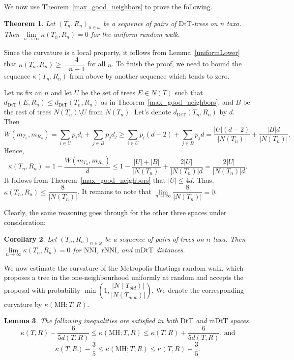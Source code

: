 \documentclass{amsart}
\newtheorem{lemma}{Lemma}
\newtheorem{corollary}[lemma]{Corollary}
\newtheorem{theorem}[lemma]{Theorem}
\newcommand{\dts}{\mathrm{DtT}}
\newcommand{\nni}{\mathrm{NNI}}
\newcommand{\rnni}{\mathrm{rNNI}}
\newcommand{\mdts}{\mathrm{mDtT}}
\newcommand{\MH}{\mathrm{MH}}
\begin{document}
We now use Theorem~\ref{max_good_neighbors} to prove the following.


\begin{theorem}\label{zero-in-the-limit}
Let $(T_n,R_n)_{n\in\omega}$ be a sequence of pairs of $\dts$-trees on $n$ taxa.
Then $\lim\limits_{n \to \infty}\kappa(T_n,R_n) = 0$ for the uniform random walk.
\end{theorem}

\proof
Since the curvature is a local property, it follows from Lemma~\ref{uniformLower} that $\kappa(T_n,R_n) \geq -\dfrac{4}{n-1}$ for all $n$.
To finish the proof, we need to bound the sequence $\kappa(T_n,R_n)$ from above by another sequence which tends to zero.

Let us fix an $n$ and let $U$ be the set of trees $E \in N(T)$ such that $d_\dts(E,R_n) \leq d_\dts(T_n,R_n)$ as in Theorem~\ref{max_good_neighbors}, and $B$ be the rest of trees $N(T_n)\setminus U$ from $N(T_n)$.
Let's denote $d_\dts(T_n,R_n)$ by $d$.
Then
\[
W(m_{T_n},m_{R_n}) = \sum_{i\in U} p_i d_i + \sum_{j\in B} p_j d_j \geq
\sum_{i\in U} p_i (d-2) + \sum_{j\in B} p_j d =
\frac{|U|(d-2)}{|N(T_n)|} + \frac{|B|d}{|N(T_n)|}.
\]
Hence,
\[
\kappa(T_n,R_n) = 1 - \frac{W(m_{T_n},m_{R_n})}{d} \leq
1 - \frac{|U| + |B|}{|N(T_n)|} + \frac{2|U|}{|N(T_n)|d}
= \frac{2|U|}{|N(T_n)|d}.
\]
It follows from Theorem~\ref{max_good_neighbors} that $|U| \leq 4d$.
Thus, $\kappa(T_n,R_n) \leq \dfrac{8}{|N(T_n)|}$.
It remains to note that $\lim\limits_{n\to\infty}\dfrac{8}{|N(T_n)|} = 0$.
\endproof

Clearly, the same reasoning goes through for the other three spaces under consideration:

\begin{corollary}
Let $(T_n,R_n)_{n\in\omega}$ be a sequence of pairs of trees on $n$ taxa.
Then $\lim\limits_{n \to \infty}\kappa(T_n,R_n) = 0$ for $\nni$, $\rnni$, and $\mdts$ distances.
\end{corollary}

We now estimate the curvature of the Metropolis-Hastings random walk, which proposes a tree in the one-neighbourhood uniformly at random and accepts the proposal with probability $\min\left(1, \dfrac{|N(T_{old})|}{|N(T_{new})|}\right)$.
We denote the corresponding curvature by $\kappa(\MH;T,R)$.

\begin{lemma}
The following inequalities are satisfied in both $\dts$ and $\mdts$ spaces.
\[
\kappa(T,R) - \dfrac{6}{5d(T,R)} \leq \kappa(\MH;T,R) \leq \kappa(T,R) +
\dfrac{6}{5d(T,R)}\mbox{, and}
\]
\[
\kappa(T,R) - \dfrac35 \leq \kappa(\MH;T,R) \leq \kappa(T,R) + \dfrac35.
\]
\end{lemma}
\end{document}
